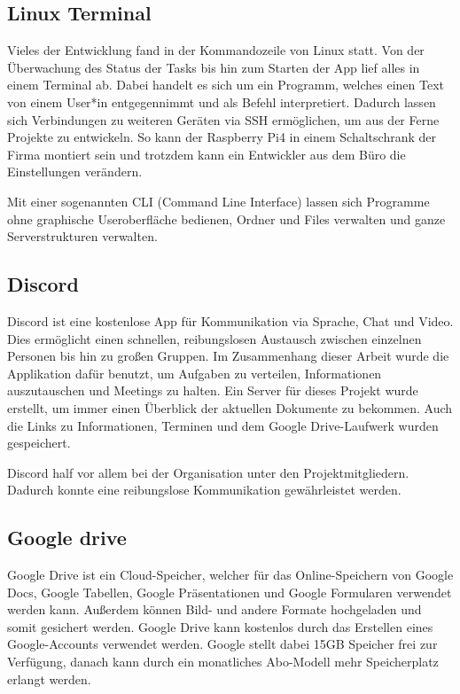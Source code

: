 \subsection{Linux Terminal} 
Vieles der Entwicklung fand in der Kommandozeile von Linux statt. Von der Überwachung des Status der Tasks bis hin zum Starten der App lief alles in einem Terminal ab. Dabei handelt es sich um ein Programm, welches einen Text von einem User*in entgegennimmt und als Befehl interpretiert. Dadurch lassen sich Verbindungen zu weiteren Geräten via SSH ermöglichen, um aus der Ferne Projekte zu entwickeln. So kann der Raspberry Pi4 in einem Schaltschrank der Firma montiert sein und trotzdem kann ein Entwickler aus dem Büro die Einstellungen verändern.


Mit einer sogenannten CLI (Command Line Interface) lassen sich Programme ohne graphische Useroberfläche bedienen, Ordner und Files verwalten und ganze Serverstrukturen verwalten.


\cite{CommandolineFortext}


\subsection{Discord} 
Discord ist eine kostenlose App für Kommunikation via Sprache, Chat und Video. Dies ermöglicht einen schnellen, reibungslosen Austausch zwischen einzelnen Personen bis hin zu großen Gruppen. Im Zusammenhang dieser Arbeit wurde die Applikation dafür benutzt, um Aufgaben zu verteilen, Informationen auszutauschen und Meetings zu halten. Ein Server für dieses Projekt wurde erstellt, um immer einen Überblick der aktuellen Dokumente zu bekommen. Auch die Links zu Informationen, Terminen und dem Google Drive-Laufwerk wurden gespeichert.


Discord half vor allem bei der Organisation unter den Projektmitgliedern. Dadurch konnte eine reibungslose Kommunikation gewährleistet werden.


\cite{discordEpic}
\subsection{Google drive} 


Google Drive ist ein Cloud-Speicher, welcher für das Online-Speichern von Google Docs, Google Tabellen, Google Präsentationen und Google Formularen verwendet werden kann. Außerdem können Bild- und andere Formate hochgeladen und somit gesichert werden. Google Drive kann kostenlos durch das Erstellen eines Google-Accounts verwendet werden. Google stellt dabei 15GB Speicher frei zur Verfügung, danach kann durch ein monatliches Abo-Modell mehr Speicherplatz erlangt werden. \cite{OneDriveOfficialSite}



